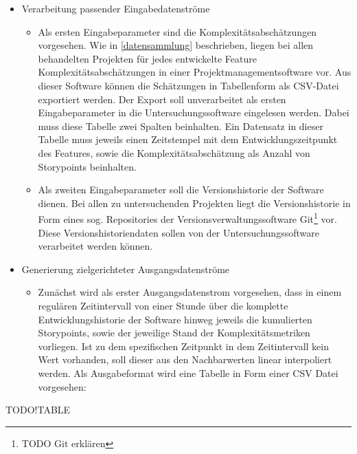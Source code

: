 \begin{itemize}
\item
    Verarbeitung passender Eingabedatenströme

    \begin{itemize}
    \item
    Als ersten Eingabeparameter sind die Komplexitätsabschätzungen
    vorgesehen. Wie in \ref{datensammlung} beschrieben, liegen bei allen behandelten
    Projekten für jedes entwickelte Feature Komplexitätsabschätzungen in
    einer Projektmanagementsoftware vor. Aus dieser Software können die
    Schätzungen in Tabellenform als CSV-Datei exportiert werden. Der
    Export soll unverarbeitet als ersten Eingabeparameter in die
    Untersuchungssoftware eingelesen werden. Dabei muss diese Tabelle
    zwei Spalten beinhalten. Ein Datensatz in dieser Tabelle muss
    jeweils einen Zeitstempel mit dem Entwicklungszeitpunkt des
    Features, sowie die Komplexitätsabschätzung als Anzahl von
    Storypoints beinhalten.
    \item
    Als zweiten Eingabeparameter soll die Versionshistorie der Software
    dienen. Bei allen zu untersuchenden Projekten liegt die
    Versionshistorie in Form eines sog. Repositories der
    Versionsverwaltungssoftware Git\footnote{TODO Git erklären} vor. Diese
    Versionshistoriendaten sollen von der Untersuchungssoftware
    verarbeitet werden können.
    \end{itemize}
\item
    Generierung zielgerichteter Ausgangsdatenströme

    \begin{itemize}
    \item
    Zunächst wird als erster Ausgangsdatenstrom vorgesehen, dass in
    einem regulären Zeitintervall von einer Stunde über die komplette
    Entwicklungshistorie der Software hinweg jeweils die kumulierten
    Storypoints, sowie der jeweilige Stand der Komplexitätsmetriken
    vorliegen. Ist zu dem spezifischen Zeitpunkt in dem Zeitintervall
    kein Wert vorhanden, soll dieser aus den Nachbarwerten linear
    interpoliert werden. Als Ausgabeformat wird eine Tabelle in Form
    einer \ac{CSV} Datei vorgesehen:
    \end{itemize}
\end{itemize}

TODO!TABLE

